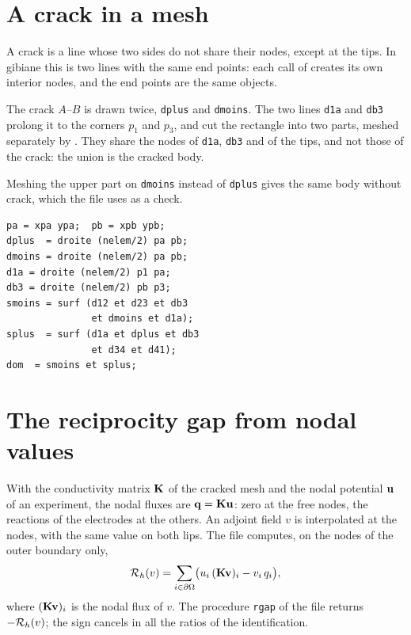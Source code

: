 \section{A crack in a mesh}\label{cc:sec3-mesh}
%
A crack is a line whose two sides do not share their nodes, except at the tips.
In gibiane this is two lines with the same end points: each call of 
creates its own interior nodes, and the end points are the same objects.
\begin{castemcom}
The crack $A$--$B$ is drawn twice, \texttt{dplus} and \texttt{dmoins}. The two
lines \texttt{d1a} and \texttt{db3} prolong it to the corners $p_1$ and
$p_3$, and cut the rectangle into two parts, meshed separately by .
They share the nodes of \texttt{d1a}, \texttt{db3} and of the tips, and not
those of the crack: the union is the cracked body.

Meshing the upper part on \texttt{dmoins} instead of \texttt{dplus} gives the
same body without crack, which the file uses as a check.
\end{castemcom}
\begin{castemlines}
\begin{verbatim}
pa = xpa ypa;  pb = xpb ypb;
dplus  = droite (nelem/2) pa pb;
dmoins = droite (nelem/2) pa pb;
d1a = droite (nelem/2) p1 pa;
db3 = droite (nelem/2) pb p3;
smoins = surf (d12 et d23 et db3
               et dmoins et d1a);
splus  = surf (d1a et dplus et db3
               et d34 et d41);
dom  = smoins et splus;
\end{verbatim}
\end{castemlines}

\section{The reciprocity gap from nodal values}\label{cc:sec3-gap}
%
With the conductivity matrix $\mathbf{K}$ of the cracked mesh and the nodal
potential $\mathbf{u}$ of an experiment, the nodal fluxes are $\mathbf{q}=\mathbf{K}\mathbf{u}$:
zero at the free nodes, the reactions of the electrodes at the others. An
adjoint field $v$ is interpolated at the nodes, with the same value on both
lips. The file computes, on the nodes of the outer boundary only,
\begin{equation}\label{cc:eq-rgh}
  \mathcal{R}_h(v)=\sum_{i\in\partial\Omega}\bigl(u_i\,(\mathbf{K}\mathbf{v})_i-v_i\,q_i\bigr),
\end{equation}
where $(\mathbf{K}\mathbf{v})_i$ is the nodal flux of $v$. The procedure
\texttt{rgap} of the file returns $-\mathcal{R}_h(v)$; the sign cancels in all the
ratios of the identification.

